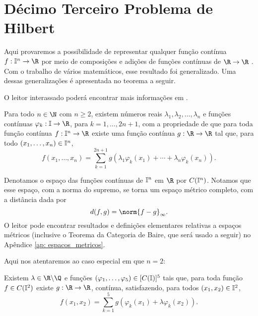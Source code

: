 \section{Décimo Terceiro Problema de Hilbert}

Aqui provaremos a possibilidade de representar qualquer função contínua \( f : \I^{ n } \to \R \) por meio de composições e adições de funções contínuas de \( \R \to \R \) .
Com o trabalho de vários matemáticos, esse resultado foi generalizado.
Uma dessas generalizações é apresentada no teorema a seguir.

O leitor interassado poderá encontrar mais informações em \cite{hilbert}.
\begin{teo}
    Para todo \( n \in \N \) com \( n \geq 2 \), existem números reais \( \lambda_{ 1 }, \lambda_{ 2 }, \dots, \lambda_{ n } \) e funções contínuas \( \varphi_{ k } : \I \to \R \), para \( k = 1, \dots, 2n + 1 \), com a propriedade de que para toda função contínua \( f : \I^{ n } \to \R \) existe uma função contínua \( g : \R \to \R \) tal que, para todo \( ( x_{ 1 }, \dots, x_{ n } ) \in \mathbb{I}^{ n } \),
    \begin{equation}
        f(x_{ 1 }, \dots, x_{ n }) =
        \sum_{ k=1 }^{ 2n+1 } g ( \lambda_{ 1 } \varphi_{ k } ( x_{ 1 } )  + \cdots + \lambda_{ n } \varphi_{ k } ( x_{ n } ) )
        \label{eq: kolmogorov_2}
    .\end{equation}
\end{teo}
\begin{rem}
    Denotamos o espaço das funções contínuas de \( \mathbb{I}^{ n } \) em \( \R \) por \( C(\mathbb{I}^{ n }) \).
    Notamos que esse espaço, com a norma do supremo, se torna um espaço métrico completo, com a distância dada por
    \begin{equation}
        d(f, g) = \norm{ f - g }_{ \infty }
    .\end{equation}
    O leitor pode encontrar resultados e definições elementares relativas a espaços métricos (inclusive o Teorema da Categoria de Baire, que será usado a seguir) no Apêndice \ref{ap: espacos_metricos}.
\end{rem}
Aqui nos atentaremos ao caso especial em que \( n = 2 \):
\begin{teo}
    Existem \( \lambda \in \R \backslash \Q \) e funções \( ( \varphi_{ 1 }, \dots, \varphi_{ 5 } ) \in [C(\mathbb{I})]^{ 5 } \) tais que, para toda função \( f \in C(\mathbb{I}^{ 2 }) \) existe \( g : \R \to \R \), contínua, satisfazendo, para todos \( ( x_{ 1 }, x_{ 2 } ) \in \mathbb{I}^{ 2 } \), \[
        f ( x_{ 1 }, x_{ 2 } ) =
        \sum_{ k=1 }^{ 5 } g ( \varphi_{ k } ( x_{ 1 } ) + \lambda \varphi_{ k } ( x_{ 2 } ) )
    .\]
    \label{teo: hilbert13}
\end{teo}
